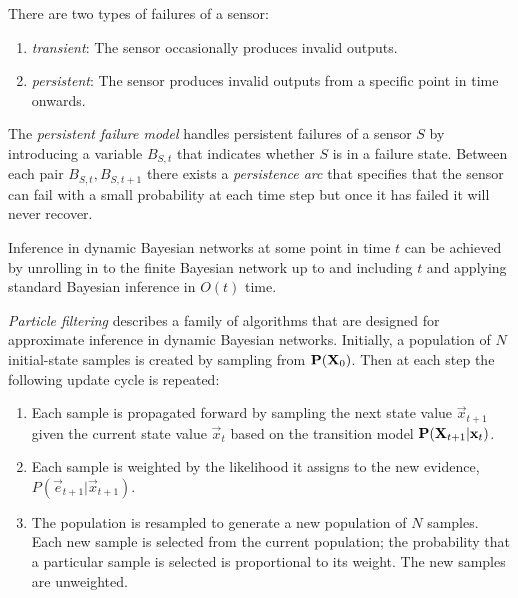 \documentclass{article}
\begin{document}
\begin{definition}
    There are two types of failures of a sensor:
    \begin{enumerate}
        \item \emph{transient}: The sensor occasionally produces invalid outputs.
        \item \emph{persistent}: The sensor produces invalid outputs from a specific point in time onwards.
    \end{enumerate}
\end{definition}

\begin{definition}
    The \emph{persistent failure model} handles persistent failures of a sensor $S$ by introducing
    a variable $B_{S,t}$ that indicates whether $S$ is in a failure state. Between each pair
    $B_{S,t}, B_{S,t+1}$ there exists a \emph{persistence arc} that specifies that the sensor can
    fail with a small probability at each time step but once  it has failed it will never recover.
\end{definition}

\begin{theorem}
    Inference in dynamic Bayesian networks at some point in time $t$ can be achieved by unrolling
    in to the finite Bayesian network up to and including $t$ and applying standard Bayesian 
    inference in $O(t)$ time.
\end{theorem}

\begin{definition}
    \emph{Particle filtering} describes a family of algorithms that are designed
    for approximate inference in dynamic Bayesian networks. Initially, a population of
    $N$ initial-state samples is created by sampling from $\P(\vec X_0)$. Then at each
    step the following update cycle is repeated:
    \begin{enumerate}
        \item Each sample is propagated forward by sampling the next state value $\vec x_{t+1}$
        given the current state value $\vec x_t$ based on the transition model $\P(\vec X_{t+1}|\vec x_t)$.
        \item Each sample is weighted by the likelihood it assigns to the new evidence, $P(\vec e_{t+1}|\vec x_{t+1})$.
        \item The population is resampled to generate a new population of $N$ samples. Each new sample is
        selected from the current population; the probability that a particular sample is selected is proportional
        to its weight. The new samples are unweighted.
    \end{enumerate}
\end{definition}
\end{document}

